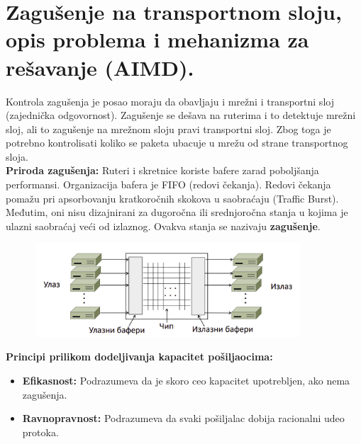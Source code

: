 \documentclass[a4paper]{article}
\begin{document}
\section{Zagušenje na transportnom sloju, opis problema i mehanizma za rešavanje (AIMD).}
    Kontrola zagušenja je posao moraju da obavljaju i mrežni i transportni sloj (zajednička odgovornost).
    Zagušenje se dešava na ruterima i to detektuje mrežni sloj, ali to zagušenje na mrežnom sloju
    pravi transportni sloj. Zbog toga je potrebno kontrolisati koliko se paketa ubacuje u mrežu
    od strane transportnog sloja. \\
    \indent \textbf{Priroda zagušenja:} Ruteri i skretnice koriste bafere zarad poboljšanja 
    performansi. Organizacija bafera je FIFO (redovi čekanja). Redovi čekanja pomažu pri apsorbovanju 
    kratkoročnih skokova u saobraćaju (Traffic Burst). Međutim, oni nisu dizajnirani za dugoročna
    ili srednjoročna stanja u kojima je ulazni saobraćaj veći od izlaznog. Ovakva stanja se nazivaju
    \textbf{zagušenje}.
    \begin{figure}[H]
        \begin{center}
            \includegraphics[width=100mm,height=35mm]{Slike/tcp_zagusenje1.png}
        \end{center}
    \end{figure}
    \noindent \textbf{Principi prilikom dodeljivanja kapacitet pošiljaocima:}
    \begin{itemize}
        \item \textbf{Efikasnost:} Podrazumeva da je skoro ceo kapacitet upotrebljen,
              ako nema zagušenja.
        \item \textbf{Ravnopravnost:} Podrazumeva da svaki pošiljalac dobija racionalni
              udeo protoka.
    \end{itemize}
\end{document}
